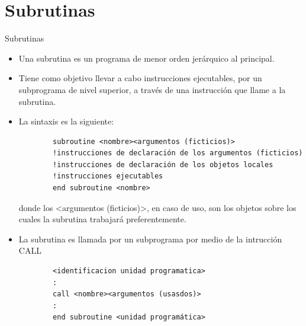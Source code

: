 
\section{Subrutinas}  



\begin{frame}[fragile]{Subrutinas}
 \begin{itemize}[<+(0)->]
  \item Una subrutina es un programa de menor orden jerárquico al principal.
  \item Tiene como objetivo llevar a cabo instrucciones ejecutables, por un subprograma de nivel superior, a través de una instrucción que llame a la subrutina.
  \item La sintaxis es la siguiente:\\
    \vspace{0.08cm} 
        \begin{verbatim}
        subroutine <nombre><argumentos (ficticios)>
        !instrucciones de declaración de los argumentos (ficticios)
        !instrucciones de declaración de los objetos locales
        !instrucciones ejecutables
        end subroutine <nombre>
        \end{verbatim}
    donde los <argumentos (ficticios)>, en caso de uso, son los objetos sobre los cuales la subrutina trabajará preferentemente.
  \item La subrutina es llamada por un subprograma por medio de la intrucción CALL
    \vspace{0.08cm} 
        \begin{verbatim}
        <identificacion unidad programatica>
        :
        call <nombre><argumentos (usasdos)>
        :
        end subroutine <unidad programática>
        \end{verbatim}  
 \end{itemize}
\end{frame}


